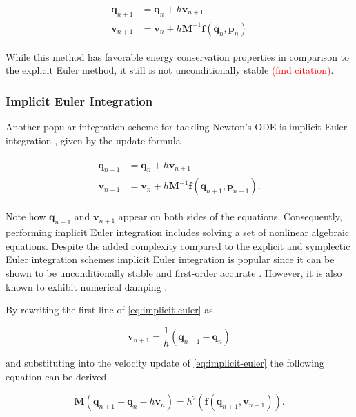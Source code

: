 \begin{align}
    \begin{split}\label{eq:symplectic-euler}
        \bm{q}_{n+1} &= \bm{q}_n + h\bm{v}_{n+1}\\
        \bm{v}_{n+1} &= \bm{v}_n + h\bm{M}^{-1}\bm{f}(\bm{q}_n, \bm{p}_n)
    \end{split}
\end{align}

While this method has favorable energy conservation properties in comparison to the explicit Euler method, it still is not unconditionally
stable \textcolor{red}{(find citation)}.

\subsubsection{Implicit Euler Integration}\label{ss:implicit-euler}
Another popular integration scheme for tackling Newton's ODE is implicit Euler integration \cite{bouaziz2014, macklin2016, bender2017}, given
by the update formula

\begin{align}
    \begin{split}\label{eq:implicit-euler}
        \bm{q}_{n+1} &= \bm{q}_n + h\bm{v}_{n+1}\\
        \bm{v}_{n+1} &= \bm{v}_n + h\bm{M}^{-1}\bm{f}(\bm{q}_{n+1}, \bm{p}_{n+1}).
    \end{split}
\end{align}

\noindent Note how $\bm{q}_{n+1}$ and $\bm{v}_{n+1}$ appear on both sides of the equations. Consequently, performing implicit 
Euler integration includes solving a set of nonlinear algebraic equations. Despite the added complexity compared to the explicit and
symplectic Euler integration schemes implicit Euler integration is popular since it can be shown to be unconditionally stable and first-order
accurate \cite{chapra2005}. However, it is also known to exhibit numerical damping \cite{servin2006, bender2017, macklin2019}.

By rewriting the first line of \cref{eq:implicit-euler} as

\[
    \bm{v}_{n+1} = \frac{1}{h}(\bm{q}_{n+1} - \bm{q}_n)
\]

\noindent and substituting into the velocity update of \cref{eq:implicit-euler} the following equation can be derived

\begin{equation}\label{eq:implicit-positional}
    \bm{M}(\bm{q}_{n+1} - \bm{q}_n - h\bm{v}_n) = h^2(\bm{f}(\bm{q}_{n+1}, \bm{v}_{n+1})).
\end{equation}

